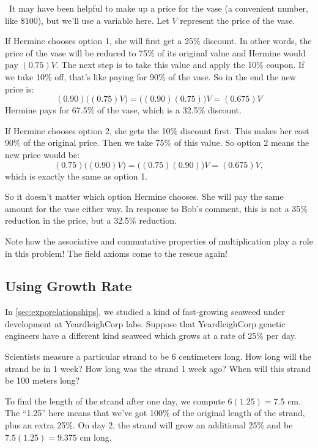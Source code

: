 \begin{boxedex}
\exsoln\ It may have been helpful to make up a price for the vase (a convenient number, like \$100), but we'll use a variable here. Let $V$ represent the price of the vase.

If Hermine chooses option 1, she will first get a 25\% discount. In other words, the price of the vase will be reduced to 75\% of its original value and Hermine would pay $(0.75)V$. The next step is to take this value and apply the 10\% coupon. If we take 10\% off, that's like paying for 90\% of the vase. So in the end the new price is: \[(0.90)\bigl((0.75)V\bigr) = \bigl((0.90)(0.75)\bigr)V= (0.675)V\] Hermine pays for 67.5\% of the vase, which is a 32.5\% discount.

If Hermine chooses option 2, she gets the 10\% discount first. This makes her cost 90\% of the original price. Then we take 75\% of this value. So option 2 means the new price would be: \[(0.75)\bigl((0.90)V\bigr) = \bigl((0.75)(0.90)\bigr)V = (0.675)V,\] which is exactly the same as option 1.

So it doesn't matter which option Hermine chooses. She will pay the same amount for the vase either way. In response to Bob's comment, this is not a 35\% reduction in the price, but a 32.5\% reduction.
\end{boxedex}

Note how the associative and commutative properties of multiplication play a role in this problem! The field axioms come to the rescue again!

\subsection{Using Growth Rate}

In \cref{sec:exporelationships}, we studied a kind of fast-growing seaweed under development at YeardleighCorp labs. Suppose that YeardleighCorp genetic engineers have a different kind seaweed which grows at a rate of 25\% per day.

Scientists measure a particular strand to be 6 centimeters long. How long will the strand be in 1 week? How long was the strand 1 week ago? When will this strand be 100 meters long?

To find the length of the strand after one day, we compute $6(1.25) = 7.5$ cm. The ``1.25'' here means that we've got 100\% of the original length of the strand, plus an extra 25\%. On day 2, the strand will grow an additional 25\% and be $7.5(1.25) = 9.375$ cm long.

